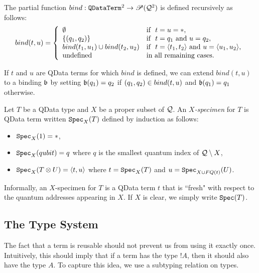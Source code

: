 \documentclass{article}
\begin{document}
\begin{definition}
The partial function $bind: \texttt{QDataTerm}^2\to {\mathscr{P}} (\mathcal{Q}^2)$ is 
defined recursively as follows:
\[
bind (t,u)= \left\{
  \begin{array}{ll}
    \emptyset & \mbox{if}~~ t=u=*, \\
    \{(q_1,q_2)\} & \mbox{if}~~ t=q_1 \mbox{ and } u=q_2, \\        
    bind (t_1,u_1) \cup bind (t_2,u_2) & 
      \mbox{if}~~ t=\langle t_1,t_2\rangle \mbox{ and } u=\langle u_1,u_2\rangle, \\
    \mbox{undefined} & \mbox{in all remaining cases.}
  \end{array}
\right.
\]
\end{definition}

\begin{remark}
\label{bind_extension}
If $t$ and $u$ are QData terms for which $bind$ is defined, we 
can extend $bind(t,u)$ to a binding $\mathfrak{b}$ by setting 
$\mathfrak{b} (q_1) = q_2$ if $(q_1,q_2)\in bind (t,u)$ and 
$\mathfrak{b} (q_1) = q_1$ otherwise.
\end{remark}

\begin{definition}
Let $T$ be a QData type and $X$ be a proper subset of $\mathcal{Q}$. 
An \emph{$X$-specimen} for $T$ is QData term written $\texttt{Spec}_X(T)$ 
defined by induction as follows:
\begin{itemize}
  \item $\texttt{Spec}_X(1)=*$,
  \item $\texttt{Spec}_X(qubit)=q$ where $q$ is the smallest quantum 
  index of $\mathcal{Q}\setminus X$,
  \item $\texttt{Spec}_X(T\otimes U)=\langle t,u\rangle$ where $t=\texttt{Spec}_X(T)$ 
  and $u=\texttt{Spec}_{X\cup FQ(t)}(U)$.  
\end{itemize}
\end{definition}


Informally, an $X$-specimen for $T$ is a QData term $t$ that is 
``fresh" with respect to the quantum addresses appearing in $X$.
If $X$ is clear, we simply write $\texttt{Spec} (T)$.


\subsection{The Type System}

The fact that a term is reusable should not prevent us from 
using it exactly once. Intuitively, this should imply that if a 
term has the type $!A$, then it should also have the type $A$. 
To capture this idea, we use a subtyping relation on types.
\end{document}
